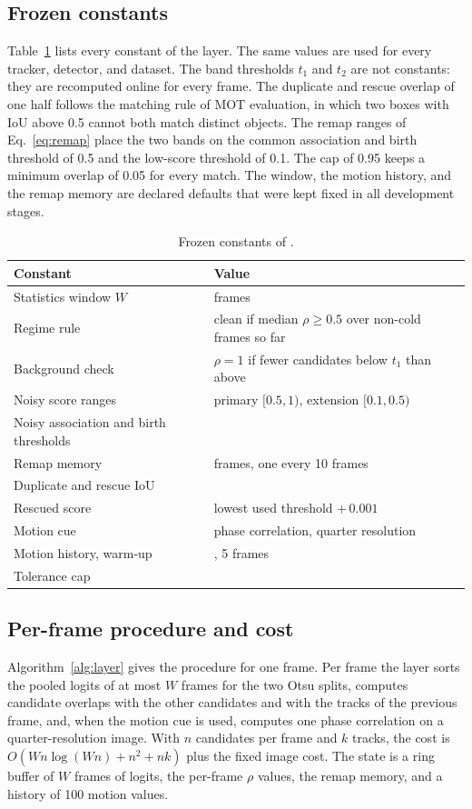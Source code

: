 \subsection{Frozen constants}\label{sec:constants}
Table~\ref{tab:constants} lists every constant of the layer. The same values
are used for every tracker, detector, and dataset. The band thresholds $t_1$
and $t_2$ are not constants: they are recomputed online for every frame. The
duplicate and rescue overlap of one half follows the matching rule of MOT
evaluation, in which two boxes with IoU above 0.5 cannot both match distinct
objects. The remap ranges of Eq.~\eqref{eq:remap} place the two bands on the
common association and birth threshold of 0.5 and the low-score threshold of
0.1. The cap of 0.95 keeps a minimum overlap of 0.05 for every match. The
window, the motion history, and the remap memory are declared defaults that
were kept fixed in all development stages.

\begin{table}[t]
\caption{Frozen constants of \scl{}.}
\label{tab:constants}
\centering\footnotesize
\begin{tabular}{@{}>{\raggedright\arraybackslash}p{39mm}>{\raggedright\arraybackslash}p{31mm}@{}}
\toprule
Constant & Value\\
\midrule
Statistics window $W$ & 10 frames\\
Regime rule & clean if median $\rho\ge0.5$ over non-cold frames so far\\
Background check & $\rho=1$ if fewer candidates below $t_1$ than above\\
Noisy score ranges & primary $[0.5,1)$, extension $[0.1,0.5)$\\
Noisy association and birth thresholds & 0.5\\
Remap memory & 20 frames, one every 10 frames\\
Duplicate and rescue IoU & 0.5\\
Rescued score & lowest used threshold $+\,0.001$\\
Motion cue & phase correlation, quarter resolution\\
Motion history, warm-up & 100, 5 frames\\
Tolerance cap & 0.95\\
\bottomrule
\end{tabular}
\end{table}

\subsection{Per-frame procedure and cost}\label{sec:cost}
Algorithm~\ref{alg:layer} gives the procedure for one frame. Per frame the
layer sorts the pooled logits of at most $W$ frames for the two Otsu splits,
computes candidate overlaps with the other candidates and with the tracks of
the previous frame, and, when the motion cue is used, computes one phase
correlation on a quarter-resolution image. With $n$ candidates per frame and
$k$ tracks, the cost is $O(Wn\log(Wn)+n^2+nk)$ plus the fixed image cost. The
state is a ring buffer of $W$ frames of logits, the per-frame $\rho$ values,
the remap memory, and a history of 100 motion values.

